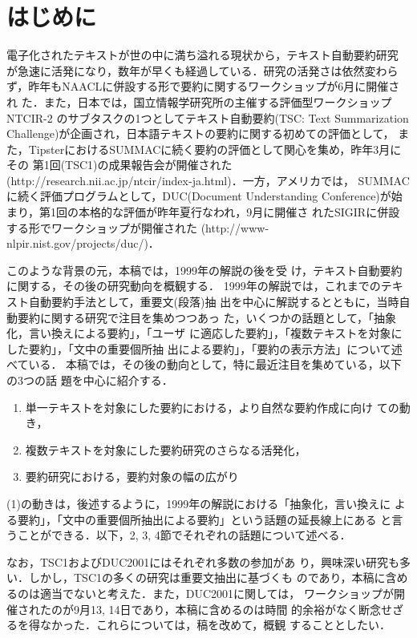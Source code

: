 \section{はじめに}

電子化されたテキストが世の中に満ち溢れる現状から，テキスト自動要約研究
が急速に活発になり，数年が早くも経過している．研究の活発さは依然変わら
ず，昨年もNAACLに併設する形で要約に関するワークショップが6月に開催され
た．また，日本では，国立情報学研究所の主催する評価型ワークショップNTCIR-2
のサブタスクの1つとしてテキスト自動要約(TSC: Text Summarization
Challenge)が企画され，日本語テキストの要約に関する初めての評価として，
また，TipsterにおけるSUMMACに続く要約の評価として関心を集め，昨年3月にその
第1回(TSC1)の成果報告会が開催された
(http://research.nii.ac.jp/ntcir/index-ja.html)．一方，アメリカでは，
SUMMACに続く評価プログラムとして，DUC(Document Understanding
Conference)が始まり，第1回の本格的な評価が昨年夏行なわれ，9月に開催さ
れたSIGIRに併設する形でワークショップが開催された
(http://www-nlpir.nist.gov/projects/duc/)．

このような背景の元，本稿では，1999年の解説\cite{okumura:99:a}の後を受
け，テキスト自動要約に関する，その後の研究動向を概観する．
1999年の解説では，これまでのテキスト自動要約手法として，重要文(段落)抽
出を中心に解説するとともに，当時自動要約に関する研究で注目を集めつつあっ
た，いくつかの話題として，「抽象化，言い換えによる要約」，「ユーザ
に適応した要約」，「複数テキストを対象にした要約」，「文中の重要個所抽
出による要約」，「要約の表示方法」について述べている．
本稿では，その後の動向として，特に最近注目を集めている，以下の3つの話
題を中心に紹介する．
\begin{enumerate}
 \item 単一テキストを対象にした要約における，より自然な要約作成に向け
 ての動き，
 \item 複数テキストを対象にした要約研究のさらなる活発化，
 \item 要約研究における，要約対象の幅の広がり
\end{enumerate}
(1)の動きは，後述するように，1999年の解説における「抽象化，言い換えに
よる要約」，「文中の重要個所抽出による要約」という話題の延長線上にある
と言うことができる．以下，2, 3, 4節でそれぞれの話題について述べる．

なお，TSC1およびDUC2001にはそれぞれ多数の参加があ
り，興味深い研究も多い．しかし，TSC1の多くの研究は重要文抽出に基づくも
のであり，本稿に含めるのは適当でないと考えた．また，DUC2001に関しては，
ワークショップが開催されたのが9月13, 14日であり，本稿に含めるのは時間
的余裕がなく断念せざるを得なかった．これらについては，稿を改めて，概観
することとしたい．

